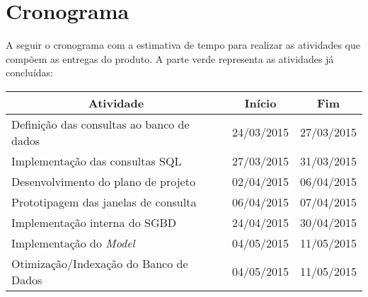 \documentclass[a4paper,12pt]{article}
\begin{document}
\newpage
\section{Cronograma}

A seguir o cronograma com a estimativa de tempo para realizar as atividades que compõem as entregas do produto. A parte verde representa as atividades já concluídas:\\


{\normalsize %

\begin{longtable}{|l|c|c|}
\hline
\multicolumn{1}{|c|}{\textbf{Atividade}}  & \multicolumn{1}{c|}{\textbf{Início}} & \multicolumn{1}{c|}{\textbf{Fim}} \\ \hline

\hline
\rowcolor{electricgreen}
Definição das consultas ao banco de dados & 24/03/2015                           & 27/03/2015                        \\ \hline

\hline
\rowcolor{electricgreen}
Implementação das consultas SQL           & 27/03/2015                           & 31/03/2015                        \\ \hline

\hline
\rowcolor{electricgreen}
Desenvolvimento do plano de projeto       & 02/04/2015                           & 06/04/2015                        \\ 

\hline
\rowcolor{electricgreen}
Prototipagem das janelas de consulta      & 06/04/2015                           & 07/04/2015                        \\ \hline

\hline
\rowcolor{electricgreen}
Implementação interna do SGBD             & 24/04/2015                           & 30/04/2015                        \\ \hline

\hline
\rowcolor{electricgreen}
Implementação do \textit{Model}           & 04/05/2015                           & 11/05/2015                        \\ \hline

\hline
\rowcolor{electricgreen}
Otimização/Indexação do Banco de Dados    & 04/05/2015                           & 11/05/2015                        \\ \hline


\end{longtable}}
\end{document}
